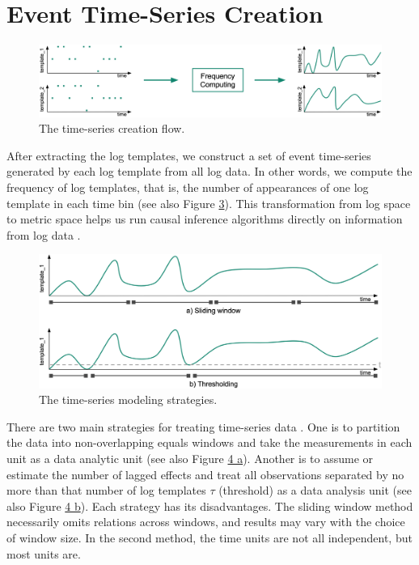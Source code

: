 \section{Event Time-Series Creation}
\label{sec:4}
\begin{figure}[H]
\centering
    \label{fig:ts-creation}
    \includegraphics[width=\textwidth]{figures/ts_creation.png}
    \caption{The time-series creation flow.}
\end{figure}
After extracting the log templates, we construct a set of event time-series generated by each log template from all log data. In other words, we compute the frequency of log templates, that is, the number of appearances of one log template in each time bin (see also Figure \hyperref[fig:ts-strategies]{3}). This transformation from log space to metric space helps us run causal inference algorithms directly on information from log data \cite{jia2017approach}.
\begin{figure}[H]
\centering
    \label{fig:ts-strategies}
    \includegraphics[width=\textwidth]{figures/ts_strategies.png}
    \caption{The time-series modeling strategies.}
\end{figure}
There are two main strategies for treating time-series data \cite{glymour2019review}. One is to partition the data into non-overlapping equals windows and take the measurements in each unit as a data analytic unit (see also Figure \hyperref[fig:ts-strategies]{4 a}). Another is to assume or estimate the number of lagged effects and treat all observations separated by no more than that number of log templates $\tau$ (threshold) as a data analysis unit (see also Figure \hyperref[fig:ts-strategies]{4 b}). Each strategy has its disadvantages. The sliding window method necessarily omits relations across windows, and results may vary with the choice of window size. In the second method, the time units are not all independent, but most units are.